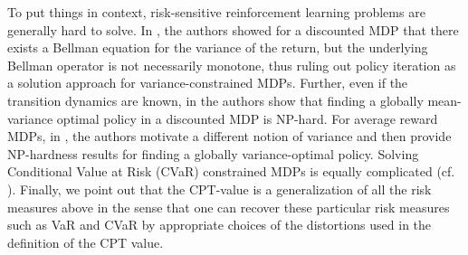 %
%

To put things in context, risk-sensitive reinforcement learning problems are generally hard to solve. 
In \cite{Sobel82VD}, the authors showed for a discounted MDP that there exists a Bellman equation for the variance of the return, but the underlying Bellman operator is not necessarily monotone, thus ruling out policy iteration as a solution approach for variance-constrained MDPs.
Further, even if the transition dynamics are known, in \cite{mannor2013algorithmic} the authors show that finding a globally mean-variance optimal policy in a discounted MDP is NP-hard.
For average reward MDPs, in \cite{filar1989variance}, the authors motivate a different notion of variance and then provide NP-hardness results for finding a globally variance-optimal policy.
Solving Conditional Value at Risk (CVaR) constrained MDPs is equally complicated (cf. \cite{borkar2010risk,prashanth2014policy,tamar2014optimizing}). 
Finally, we point out that the CPT-value is a generalization of all the risk measures above in the sense that one can recover these particular risk measures such as VaR and CVaR by appropriate choices of the distortions used in the definition of the CPT value.

